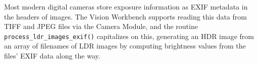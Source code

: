Most modern digital cameras store exposure information as EXIF
metadata in the headers of images.  The Vision Workbench supports
reading this data from TIFF and JPEG files via the Camera Module, and
the routine \verb#process_ldr_images_exif()# capitalizes on this,
generating an HDR image from an array of filenames of LDR images by
computing brightness values from the files' EXIF data along the
way. 






